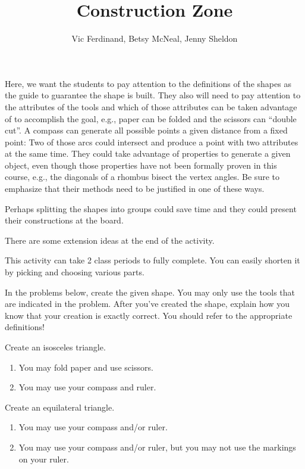 \documentclass{ximera}
\title{Construction Zone}
\author{Vic Ferdinand, Betsy McNeal, Jenny Sheldon}
\begin{document}
\begin{abstract}
\end{abstract}
\maketitle

\begin{instructorIntro}
Here, we want the students to pay attention to the definitions of the shapes as the guide to guarantee the shape is built.  They also will need to pay attention to the attributes of the tools and which of those attributes can be taken advantage of to accomplish the goal, e.g., paper can be folded and the scissors can “double cut”.  A compass can generate all possible points a given distance from a fixed point:  Two of those arcs could intersect and produce a point with two attributes at the same time.   
     They could take advantage of properties to generate a given object, even though those properties have not been formally proven in this course, e.g., the diagonals of a rhombus bisect the vertex angles.  Be sure to emphasize that their methods need to be justified in one of these ways.
     
     Perhaps splitting the shapes into groups could save time and they could present their constructions at the board.
     
  There are some extension ideas at the end of the activity.
    
    This activity can take 2 class periods to fully complete.  You can easily shorten it by picking and choosing various parts.
\end{instructorIntro}

In the problems below, create the given shape.  You may only use the tools that are indicated in the problem.  After you've created the shape, explain how you know that your creation is exactly correct.  You should refer to the appropriate definitions!

\begin{problem}
Create an isosceles triangle.
\begin{enumerate}
\item You may fold paper and use scissors.
\item You may use your compass and ruler.
\end{enumerate}
\end{problem}

\begin{problem}
Create an equilateral triangle.
\begin{enumerate}

\item You may use your compass and/or ruler.
\item You may use your compass and/or ruler, but you may not use the markings on your ruler.
\end{enumerate}
\end{problem}
\end{document}
